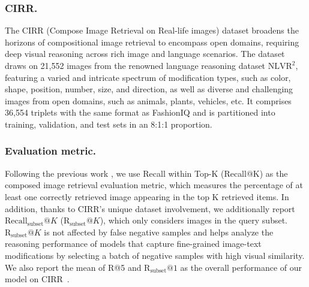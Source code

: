 \documentclass[letterpaper]{article} \usepackage{aaai24}  \usepackage{times}  \usepackage{helvet}  \usepackage{courier}  \usepackage[hyphens]{url}  \usepackage{graphicx} \urlstyle{rm} \def\UrlFont{\rm}  \usepackage{natbib}  \usepackage{caption} \frenchspacing  \setlength{\pdfpagewidth}{8.5in} \setlength{\pdfpageheight}{11in} \usepackage{amsmath,amsfonts}
\begin{document}
\subsubsection{CIRR.}
The CIRR (Compose Image Retrieval on Real-life images) dataset \cite{liu2021image} broadens the horizons of compositional image retrieval to encompass open domains, requiring deep visual reasoning across rich image and language scenarios.  The dataset draws on 21,552 images from the renowned language reasoning dataset $\text{NLVR}^{2}$, featuring a varied and intricate spectrum of modification types, such as color, shape, position, number, size, and direction, as well as diverse and challenging images from open domains, such as animals, plants, vehicles, etc.  It comprises 36,554 triplets with the same format as FashionIQ and is partitioned into training, validation, and test sets in an 8:1:1 proportion. 

\subsubsection{Evaluation metric.}
Following the previous work \cite{liu2021image, CLIP4Cir}, we use Recall within Top-K (Recall@K) as the composed image retrieval evaluation metric, which measures the percentage of at least one correctly retrieved image appearing in the top K retrieved items. In addition, thanks to CIRR's unique dataset involvement, we additionally report $\text{Recall}_{\text{subset}}@K$ ($\text{R}_{\text{subset}}@K$), which only considers images in the query subset. $\text{R}_{\text{subset}}@K$ is not affected by false negative samples and helps analyze the reasoning performance of models that capture fine-grained image-text modifications by selecting a batch of negative samples with high visual similarity. We also report the mean of R@5 and R$_\text{subset}@1$ as the overall performance of our model on CIRR~\cite{liu2021image}.
\end{document}
